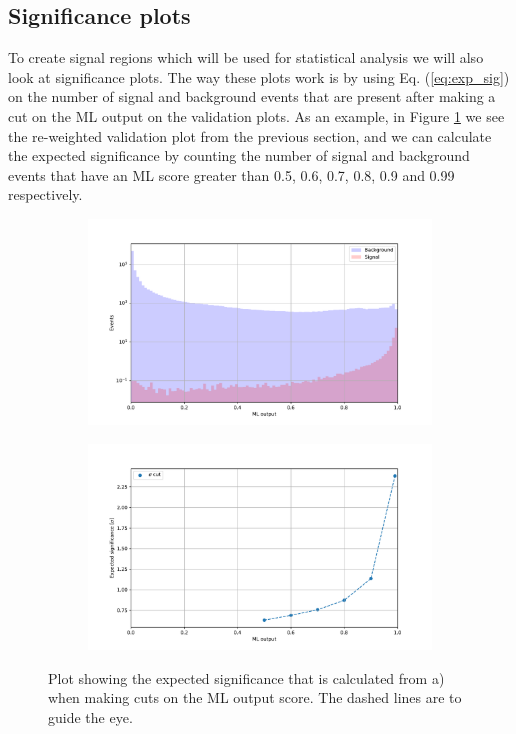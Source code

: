 \documentclass[12pt, a4paper]{book}
\begin{document}
\clearpage
\subsection{Significance plots}\label{sec:siggy}
To create signal regions which will be used for statistical analysis we will also look at significance plots. The way these plots work is by using Eq. (\ref{eq:exp_sig}) on the number of signal and background events that are present after making a cut on the ML output on the validation plots. 
As an example, in Figure \ref{fig:EXP_SIG} we see the re-weighted validation plot from the previous section, and we can calculate the expected significance by counting the number of signal and background events that have an ML score greater than 0.5, 0.6, 0.7, 0.8, 0.9 and 0.99 respectively.
\begin{figure}[!ht]
	\centering
    \begin{subfigure}[b]{0.7\textwidth}
        \centering
        \includegraphics[width=\textwidth]{VAL.pdf}
    \end{subfigure}
    \hfill
    \begin{subfigure}[b]{0.7\textwidth}
        \centering
        \includegraphics[width=\textwidth]{EXP_SIG.pdf}
    \end{subfigure}
    \caption[Significance plot illustration]{Plot showing the expected significance that is calculated from a) when making cuts on the ML output score. The dashed lines are to guide the eye.}\label{fig:EXP_SIG}
\end{figure}
\end{document}
